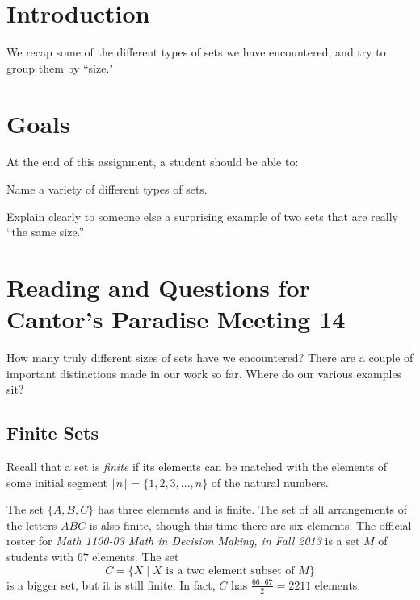 \documentclass[12pt,letterpaper]{article}
\theoremstyle{definition}
\begin{document}
\setlength{\parskip}{1ex plus 0.5ex minus 0.2ex}
\setlength{\parindent}{0pt}

\pagestyle{fancy}
\cfoot{}

\section*{Introduction}
We recap some of the different types of sets we have encountered, and try to group them by ``size."

\section*{Goals}
At the end of this assignment, a student should be able to:
\begin{compactitem}
\item Name a variety of different types of sets.
\item Explain clearly to someone else a surprising example of two sets that are really ``the same size.''
\end{compactitem}

\section*{Reading and Questions for Cantor's Paradise Meeting 14}

How many truly different sizes of sets have we encountered?
There are a couple of important distinctions made in our work so far.
Where do our various examples sit?

\subsection*{Finite Sets}

Recall that a set is \emph{finite} if its elements can be matched with the elements of some initial segment $\lfloor n \rfloor = \{ 1, 2, 3, \ldots , n \}$ of the natural numbers.

The set $\{A, B, C\}$ has three elements and is finite.
The set of all arrangements of the letters $ABC$ is also finite, though this time there are six elements.
The official roster for \emph{Math 1100-03 Math in Decision Making, in Fall 2013} is a set $M$ of students with $67$ elements.
The set
\[
C = \{ X \mid \text{$X$ is a two element subset of $M$} \}
\]
is a bigger set, but it is still finite.
In fact, $C$ has $\frac{66\cdot 67}{2} = 2211$ elements.
\end{document}
